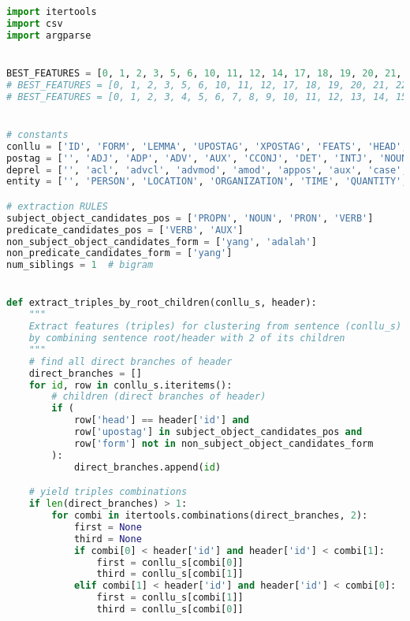 \begin{lstlisting}[language=Python]
import itertools
import csv
import argparse


BEST_FEATURES = [0, 1, 2, 3, 5, 6, 10, 11, 12, 14, 17, 18, 19, 20, 21, 22, 23]  # F1 0.586
# BEST_FEATURES = [0, 1, 2, 3, 5, 6, 10, 11, 12, 17, 18, 19, 20, 21, 22, 23]   # F1 0.579
# BEST_FEATURES = [0, 1, 2, 3, 4, 5, 6, 7, 8, 9, 10, 11, 12, 13, 14, 15, 16, 17, 18, 19, 20, 21, 22, 23, 24, 25, 26]  # F1 0.547


# constants
conllu = ['ID', 'FORM', 'LEMMA', 'UPOSTAG', 'XPOSTAG', 'FEATS', 'HEAD', 'DEPREL', 'DEPS', 'MISC']
postag = ['', 'ADJ', 'ADP', 'ADV', 'AUX', 'CCONJ', 'DET', 'INTJ', 'NOUN', 'NUM', 'PART', 'PRON', 'PROPN', 'PUNCT', 'SCONJ', 'SYM', 'VERB', 'X', 'CONJ']
deprel = ['', 'acl', 'advcl', 'advmod', 'amod', 'appos', 'aux', 'case', 'cc', 'ccomp', 'clf', 'compound', 'conj', 'cop', 'csubj', 'dep', 'det', 'discourse', 'dislocated', 'expl', 'fixed', 'flat', 'goeswith', 'iobj', 'list', 'mark', 'nmod', 'nsubj', 'nummod', 'obj', 'obl', 'orphan', 'parataxis', 'punct', 'reparandum', 'root', 'vocative', 'xcomp', 'nsubjpass', 'name', 'dobj', 'neg', 'mwe', 'csubjpass']
entity = ['', 'PERSON', 'LOCATION', 'ORGANIZATION', 'TIME', 'QUANTITY', 'OTHER']

# extraction RULES
subject_object_candidates_pos = ['PROPN', 'NOUN', 'PRON', 'VERB']
predicate_candidates_pos = ['VERB', 'AUX']
non_subject_object_candidates_form = ['yang', 'adalah']
non_predicate_candidates_form = ['yang']
num_siblings = 1  # bigram


def extract_triples_by_root_children(conllu_s, header):
    """
    Extract features (triples) for clustering from sentence (conllu_s)
    by combining sentence root/header with 2 of its children
    """
    # find all direct branches of header
    direct_branches = []
    for id, row in conllu_s.iteritems():
        # children (direct branches of header)
        if (
            row['head'] == header['id'] and
            row['upostag'] in subject_object_candidates_pos and
            row['form'] not in non_subject_object_candidates_form
        ):
            direct_branches.append(id)

    # yield triples combinations
    if len(direct_branches) > 1:
        for combi in itertools.combinations(direct_branches, 2):
            first = None
            third = None
            if combi[0] < header['id'] and header['id'] < combi[1]:
                first = conllu_s[combi[0]]
                third = conllu_s[combi[1]]
            elif combi[1] < header['id'] and header['id'] < combi[0]:
                first = conllu_s[combi[1]]
                third = conllu_s[combi[0]]


\end{lstlisting}
